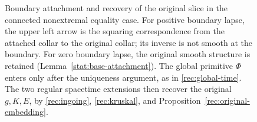 \begin{figure}[tbp]
\caption{Boundary attachment and recovery of the original slice in the
connected nonextremal equality case. For positive boundary lapse, the upper
left arrow is the squaring correspondence from the attached collar to the
original collar; its inverse is not smooth at the boundary. For zero
boundary lapse, the original smooth structure is retained
(Lemma~\ref{stat:base-attachment}). The global primitive $\Phi$ enters only
after the uniqueness argument, as in \eqref{rec:global-time}. The two regular
spacetime extensions then recover the original $g,K,E$, by
\eqref{rec:ingoing}, \eqref{rec:kruskal}, and
Proposition~\ref{rec:original-embedding}.}
\label{rec:fig-boundary-recovery}
\end{figure}
